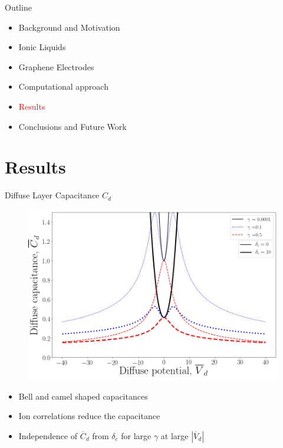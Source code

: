 \documentclass{beamer}
\begin{document}
\begin{frame}{Outline}

\begin{itemize}
\item Background and Motivation\\
\item Ionic Liquids\\
\item Graphene Electrodes\\
\item Computational approach \\
\item \textcolor{red}{Results} \\
\item Conclusions and Future Work
\end{itemize}
\end{frame}

\section{Results}
\begin{frame}{Diffuse Layer Capacitance $C_d$}
    \begin{figure}[!h]
    \begin{center}
    \includegraphics[scale=0.2]{figure_3.png}
    \end{center}
    \end{figure}
    \begin{itemize} 
    \item Bell and camel shaped capacitances
    \item Ion correlations reduce the capacitance
    \item Independence of $\overline{C}_d$ from $\delta_c$ for large $\gamma$ at large $|\overline{V}_d|$
    \end{itemize}
\end{frame}
\end{document}
